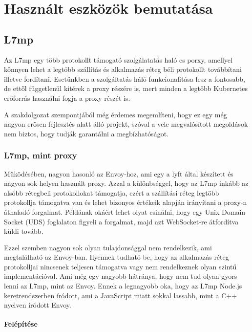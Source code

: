 \chapter{Használt eszközök bemutatása}

\section{L7mp}

Az L7mp egy több protokollt támogató szolgálatatás haló es porxy, amellyel 
könnyen lehet a legtöbb szállítás és alkalmazás réteg béli protokollt továbbítani
illetve fordítani. Esetünkben a szolgáltatás háló funkcionalitása lesz a 
fontosabb, de ettől függetlenül kitérek a proxy részére is, mert minden a 
legtöbb Kubernetes erőforrás használni fogja a proxy részét is. 

A szakdolgozat szempontjából még érdemes megemlíteni, hogy ez egy még nagyon 
erősen fejlesztés alatt álló projekt, szóval a vele megvalósított megoldások 
nem biztos, hogy tudják garantálni a megbízhatóságot. 

\subsection{L7mp, mint proxy}

Működésében, nagyon hasonló az Envoy-hoz, ami egy a lyft által készített és 
nagyon sok helyen használt proxy. Azzal a különbséggel, hogy az L7mp inkább 
az alsóbb rétegbeli protokollokat támogatja, ezért a szállítási réteg legtöbb 
protokollja támogatva van és lehet bizonyos értékeik alapján irányítani a 
proxy-n áthaladó forgalmat. Példának okáért lehet olyat csinálni, hogy egy
Unix Domain Socket (UDS) foglalaton figyeli a forgalmat, majd azt WebSocket-re
átfordítva küldi tovább. 

Ezzel szemben nagyon sok olyan tulajdonsággal nem rendelkezik, ami megtalálható
az Envoy-ban. Ilyennek tudható be, hogy az alkalmazás réteg protokolljai nincsenek 
teljesen támogatva vagy nem rendelkeznek olyan szintű implementációval. Ami 
még egy nagyobb hátránya, hogy nem tud olyan gyors lenni az L7mp, mint az Envoy.
Ennek a legnagyobb oka, hogy az L7mp Node.js keretrendszerben íródott, ami a 
JavaScript miatt sokkal lassabb, mint a C++ nyelven íródott Envoy.

\subsubsection{Felépítése}

